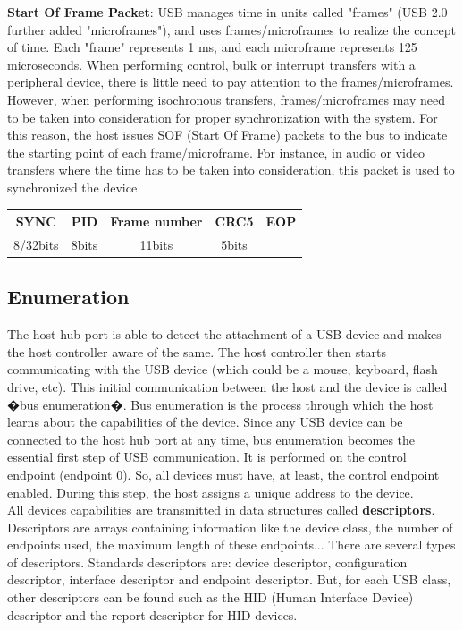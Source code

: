 \documentclass[pdftex,10pt,a4paper]{report}
\newenvironment{packed_item}{
\begin{itemize}
  \setlength{\itemsep}{1pt}
  \setlength{\parskip}{0pt}
  \setlength{\parsep}{0pt}
}{\end{itemize}}
\begin{document}
\begin{packed_item}
  	
	\item \textbf{Start Of Frame Packet}: USB manages time in units called "frames" (USB 2.0 further added "microframes"), and uses frames/microframes to realize the concept of time. Each "frame" represents 1 ms, and each microframe represents 125 microseconds. When performing control, bulk or interrupt transfers with a peripheral device, there is little need to pay attention to the frames/microframes. However, when performing isochronous transfers, frames/microframes may need to be taken into consideration for proper synchronization with the system. For this reason, the host issues SOF (Start Of Frame) packets to the bus to indicate the starting point of each frame/microframe. For instance, in audio or video transfers where the time has to be taken into consideration, this packet is used to synchronized the device
	
		\begin{center}
		\begin{tabular}{|c|c|c|c|c|}
  	\hline
  		SYNC & PID & Frame number & CRC5 & EOP \\ \hline
  		8/32bits & 8bits & 11bits & 5bits &   \\
  	\hline
  	\end{tabular}
  	\end{center}
  	
\end{packed_item}


\subsection{Enumeration}
The host hub port is able to detect the attachment of a USB device and makes the host controller aware of the same. The host controller then starts communicating with the USB device (which could be a mouse, keyboard, flash drive, etc). This initial communication between the host and the device is called �bus enumeration�. Bus enumeration is the process through which the host learns about the capabilities of the device. Since any USB device can be connected to the host hub port at any time, bus enumeration becomes the essential first step of USB communication. It is performed on the control endpoint (endpoint 0). So, all devices must have, at least, the control endpoint enabled.
During this step, the host assigns a unique address to the device. \\


All devices capabilities are transmitted in data structures called \textbf{descriptors}. Descriptors are arrays containing information like the device class, the number of endpoints used, the maximum length of these endpoints... There are several types of descriptors. Standards descriptors are: device descriptor, configuration descriptor, interface descriptor and endpoint descriptor. But, for each USB class, other descriptors can be found such as the HID (Human Interface Device) descriptor and the report descriptor for HID devices.
\end{document}
